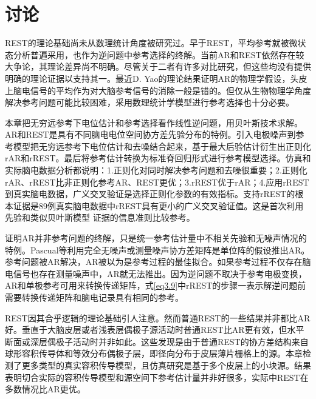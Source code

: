 \section{讨论}
REST的理论基础尚未从数理统计角度被研究过。早于REST，平均参考就被微状态分析普遍采用，也作为逆问题中参考选择的终解。当前AR和REST依然存在较大争论，其理论差异尚不明确。尽管关于二者有许多对比研究，但这些均没有提供明确的理论证据以支持其一。最近D. Yao的理论结果证明AR的物理学假设，头皮上脑电信号的平均作为对大脑参考信号的消除一般是错的。但仅从生物物理学角度解决参考问题可能比较困难，采用数理统计学模型进行参考选择也十分必要。

本章把无穷远参考下电位估计和参考选择看作线性逆问题，用贝叶斯技术求解。AR和REST是具有不同脑电电位空间协方差先验分布的特例。引入电极噪声到参考模型把无穷远参考下电位估计和去噪结合起来，基于最大后验估计衍生出正则化rAR和rREST。最后将参考估计转换为标准脊回归形式进行参考模型选择。仿真和实际脑电数据分析都说明：1.正则化对同时解决参考问题和去噪很重要；2.正则化rAR、rREST比非正则化参考AR、REST更优；3.rREST优于rAR；4.应用rREST到真实脑电数据，广义交叉验证是选择正则化参数的有效指标。支持rREST的根本证据是89例真实脑电数据中rREST具有更小的广义交叉验证值。这是首次利用先验和类似贝叶斯模型
证据的信息准则比较参考。

证明AR并非参考问题的终解，只是统一参考估计量中不相关先验和无噪声情况的特例。Pascual等利用完全无噪声或测量噪声协方差矩阵是单位阵的假设推出AR。参考问题被AR解决，AR被以为是参考过程的最佳拟合。如果参考过程不仅存在脑电信号也存在测量噪声中，AR就无法推出。因为逆问题不取决于参考电极变换，AR和单极参考可用来转换传递矩阵，式\eqref{eq3.9}中rREST的步骤一表示解逆问题前需要转换传递矩阵和脑电记录具有相同的参考。

REST因其合乎逻辑的理论基础引人注意。然而普通REST的一些结果并非都比AR好。垂直于大脑皮层或者浅表层偶极子源活动时普通REST比AR更有效，但水平断面或深层偶极子活动时并非如此。这些发现是由于普通REST的协方差结构来自球形容积传导体和等效分布偶极子层，即径向分布于皮层薄片栅格上的源。本章检测了更多类型的真实容积传导模型，且仿真研究是基于多个皮层上的小块源。结果表明切合实际的容积传导模型和源空间下参考估计量并非好很多，实际中REST在多数情况比AR更优。

